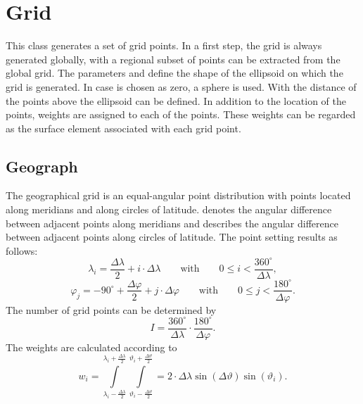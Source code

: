 \clearpage

\section{Grid}\label{gridType}
This class generates a set of grid points. In a first step, the grid
is always generated globally, with  a regional
subset of points can be extracted from the global grid. The parameters
 and  define the shape of the ellipsoid
on which the grid is generated. In case  is
chosen as zero, a sphere is used. With  the distance of
the points above the ellipsoid can be defined. In addition to the location
of the points, weights are assigned to each of the points. These weights
can be regarded as the surface element associated with each grid point.


\subsection{Geograph}
The geographical grid is an equal-angular point distribution with points
located along meridians and along circles of latitude. 
denotes the angular difference between adjacent points along meridians and
 describes the angular difference between adjacent points
along circles of latitude. The point setting results as follows:
\begin{equation}
\lambda_i=\frac{\Delta\lambda}{2}+i\cdot\Delta\lambda\qquad\mbox{with}\qquad 0\leq i< \frac{360^\circ}{\Delta\lambda},
\end{equation}
\begin{equation}
\varphi_j=-90^\circ+\frac{\Delta\varphi}{2}+j\cdot\Delta\varphi\qquad\mbox{with}\qquad 0\leq j<\frac{180^\circ}{\Delta\varphi}.
\end{equation}
The number of grid points can be determined by
\begin{equation}
I=\frac{360^\circ}{\Delta\lambda}\cdot\frac{180^\circ}{\Delta\varphi}.
\end{equation}
The weights are calculated according to
\begin{equation}
w_i=\int\limits_{\lambda_i-\frac{\Delta\lambda}{2}}^{\lambda_i+\frac{\Delta\lambda}{2}}\int\limits_{\vartheta_i-\frac{\Delta\vartheta}{2}}^{\vartheta_i+\frac{\Delta\vartheta}{2}}=2\cdot\Delta\lambda\sin(\Delta\vartheta)\sin(\vartheta_i).
\end{equation}


